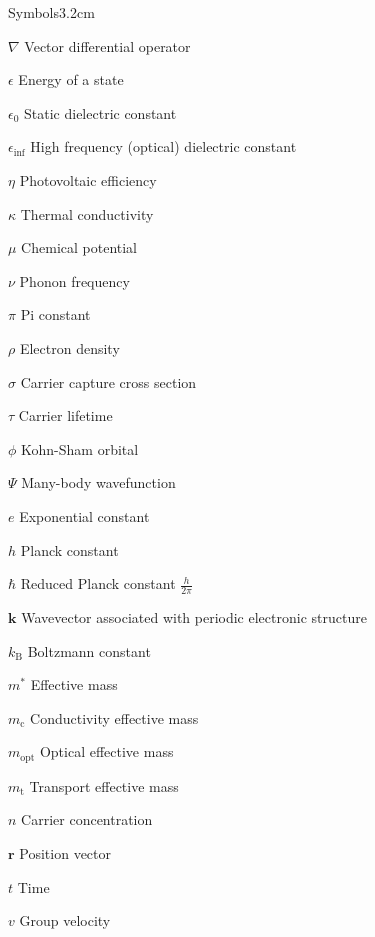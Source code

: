 \begin{mclistof}{Symbols}{3.2cm}

\item[$\nabla$] Vector differential operator
\item[$\epsilon$] Energy of a state
\item[$\epsilon_0$] Static dielectric constant
\item[$\epsilon_{\inf}$] High frequency (optical) dielectric constant 
\item[$\eta$] Photovoltaic efficiency
\item[$\kappa$] Thermal conductivity
\item[$\mu$] Chemical potential
\item[$\nu$] Phonon frequency
\item[$\pi$] Pi constant 
\item[$\rho$] Electron density
\item[$\sigma$] Carrier capture cross section
\item[$\tau$] Carrier lifetime
\item[$\phi$] Kohn-Sham orbital

\vspace{\frontmatterbaselineskip}

\item[$\Psi$] Many-body wavefunction

\vspace{\frontmatterbaselineskip}

\item[$e$] Exponential constant
\item[$h$] Planck constant 
\item[$\hbar$] Reduced Planck constant $\frac{h}{2\pi}$ 
\item[$\textbf{k}$] Wavevector associated with periodic electronic structure
\item[$k_\mathrm{B}$] Boltzmann constant 
\item[$m^*$] Effective mass
\item[$m_\mathrm{c}$] Conductivity effective mass
\item[$m_\mathrm{opt}$] Optical effective mass
\item[$m_\mathrm{t}$] Transport effective mass
\item[$n$] Carrier concentration
\item[$\textbf{r}$] Position vector
\item[$t$] Time
\item[$v$] Group velocity


\end{mclistof}
